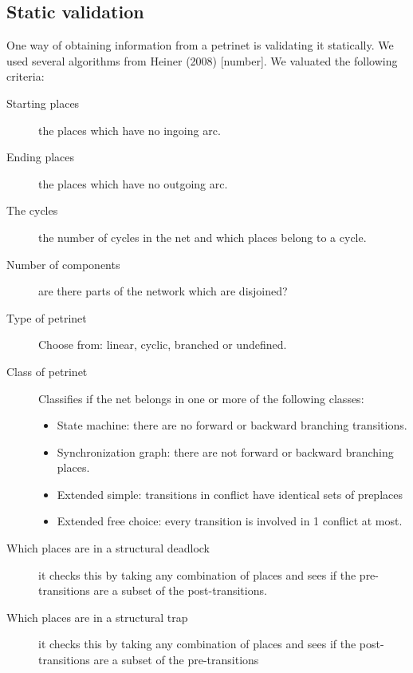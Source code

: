 \documentclass[12pt,a4paper,draft]{article}
\begin{document}
\subsection{Static validation}\label{sec:static_validation}
    One way of obtaining information from a petrinet is validating it statically. We used several algorithms from Heiner (2008) [number]. We valuated the following criteria:
    \begin{description}
        
    \item [Starting places] the places which have no ingoing arc.
    
    \item [Ending places]\label{item:ending_places} the places which have no outgoing arc.
    
    \item [The cycles] the number of cycles in the net and which places belong to a cycle.
    
    \item [Number of components] are there parts of the network which are disjoined?

    \item [Type of petrinet] Choose from: linear, cyclic, branched or undefined.

    \item [Class of petrinet] Classifies if the net belongs in one or more of the following classes:
    \begin{itemize}
        \item State machine: there are no forward or backward branching transitions.
        \item Synchronization graph: there are not forward or backward branching places.
        \item Extended simple: transitions in conflict have identical sets of preplaces
        \item Extended free choice: every transition is involved in 1 conflict at most.
    \end{itemize}
    
    \item [Which places are in a structural deadlock] it checks this by taking any combination of places and sees if the pre-transitions are a subset of the post-transitions.
    
    \item [Which places are in a structural trap] it checks this by taking any combination of places and sees if the post-transitions are a subset of the pre-transitions
    

\end{description}
\end{document}
